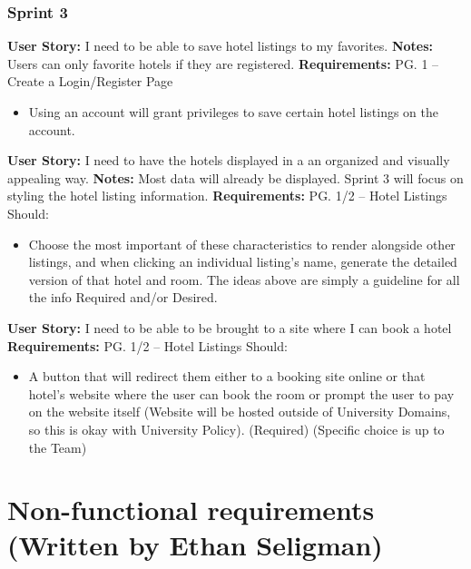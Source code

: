 \documentclass[]{article}
\begin{document}
\subsubsection{Sprint 3}

\noindent
\textbf{User Story:} I need to be able to save hotel listings to my favorites. \newline
\textbf{Notes:} Users can only favorite hotels if they are registered. \newline
\textbf{Requirements:} PG. 1 – Create a Login/Register Page
\begin{itemize}
    \item Using an account will grant privileges to save certain hotel listings on the account.
\end{itemize}

\noindent
\textbf{User Story:} I need to have the hotels displayed in a an organized and visually appealing way. \newline
\textbf{Notes:} Most data will already be displayed. Sprint 3 will focus on styling the hotel listing information. \newline
\textbf{Requirements:} PG. 1/2 – Hotel Listings Should:
\begin{itemize}
    \item Choose the most important of these characteristics to render alongside other listings, and when clicking an individual listing’s name, generate the detailed version of that hotel and room. The ideas above are simply a guideline for all the info Required and/or Desired.
\end{itemize}

\noindent
\textbf{User Story:} I need to be able to be brought to a site where I can book a hotel \newline
\textbf{Requirements:} PG. 1/2 – Hotel Listings Should:
\begin{itemize}
    \item A button that will redirect them either to a booking site online or that hotel’s website where the user can book the room or prompt the user to pay on the website itself (Website will be hosted outside of University Domains, so this is okay with University Policy). (Required) (Specific choice is up to the Team)
\end{itemize}

\section{Non-functional requirements \\ (Written by Ethan Seligman)}
\end{document}
